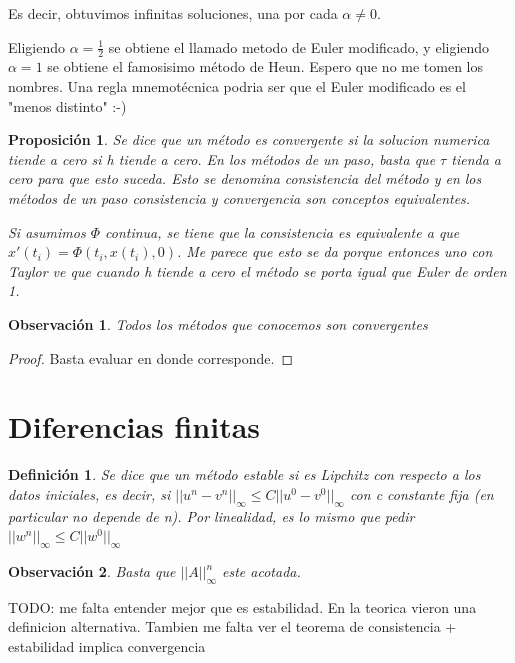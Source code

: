 \documentclass[10pt,a4paper,final]{report}
\newtheorem{definition}{Definición}
\newtheorem{proposition}{Proposición}
\newtheorem{observation}{Observación}
\begin{document}
Es decir, obtuvimos infinitas soluciones, una por cada $\alpha \neq 0$.


Eligiendo $\alpha=\frac{1}{2}$ se obtiene el llamado metodo de Euler modificado, y eligiendo $\alpha=1$ se obtiene el famosisimo método de Heun. Espero que no me tomen los nombres. Una regla mnemotécnica podria ser que el Euler modificado es el "menos distinto" :-)



\begin{proposition}
    Se dice que un método es convergente si la solucion numerica tiende a cero si h tiende a cero. En los métodos de un paso, basta que $\tau$ tienda a cero para que esto suceda. Esto se denomina consistencia del método y en los métodos de un paso consistencia y convergencia son conceptos equivalentes.
    
    Si asumimos $\Phi$ continua, se tiene que la consistencia es equivalente a que $x'(t_i) = \Phi(t_i,x(t_i),0)$. Me parece que esto se da porque entonces uno con Taylor ve que cuando h tiende a cero el método se porta igual que Euler de orden 1.
    
\end{proposition}


\begin{observation}
    Todos los métodos que conocemos son convergentes
\end{observation}


\begin{proof}
    Basta evaluar en donde corresponde.
\end{proof}




\section{Diferencias finitas}


\begin{definition}
    Se dice que un método estable si es Lipchitz con respecto a los datos iniciales, es decir, si $||u^n-v^n||_{\infty} \leq C ||u^0-v^0||_{\infty}$ con c constante fija (en particular no depende de n). Por linealidad, es lo mismo que pedir $||w^n||_{\infty} \leq C ||w^0||_{\infty}$
\end{definition}

\begin{observation}
    Basta que $||A||_\infty^n$ este acotada.
\end{observation}

TODO: me falta entender mejor que es estabilidad. En la teorica vieron una definicion alternativa. Tambien me falta ver el teorema de consistencia + estabilidad implica convergencia
\end{document}

